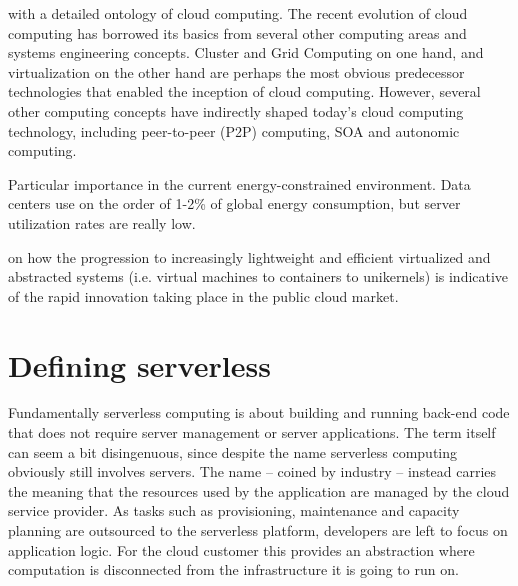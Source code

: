 \documentclass[utf8,english]{gradu3}
\begin{document}
\textcite{youseff08cloudOntology} with a detailed ontology of cloud computing. The recent evolution of cloud computing has borrowed its basics from several other computing areas and systems engineering concepts. Cluster and Grid Computing on one hand, and virtualization on the other hand are perhaps the most obvious predecessor technologies that enabled the inception of cloud computing. However, several other computing concepts have indirectly shaped today's cloud computing technology, including peer-to-peer (P2P) computing, SOA and autonomic computing.



Particular importance in the current energy-constrained environment. Data centers use on the order of 1-2\% of global energy consumption, but server utilization rates are really low. \parencite{horner16powerusage}

\textcite{bernstein14containers} on how the progression to increasingly lightweight and efficient virtualized and abstracted systems (i.e. virtual machines to containers to unikernels) is indicative of the rapid innovation taking place in the public cloud market.


\section{Defining serverless} \label{sec:definingServerless}


Fundamentally serverless computing is about building and running back-end code that does not require server management or server applications. The term itself can seem a bit disingenuous, since despite the name serverless computing obviously still involves servers. The name -- coined by industry -- instead carries the meaning that the resources used by the application are managed by the cloud service provider. As tasks such as provisioning, maintenance and capacity planning are outsourced to the serverless platform, developers are left to focus on application logic. For the cloud customer this provides an abstraction where computation is disconnected from the infrastructure it is going to run on. \parencite{robert2016serverlessarchitectures,cncf18serverlessWG}
\end{document}

